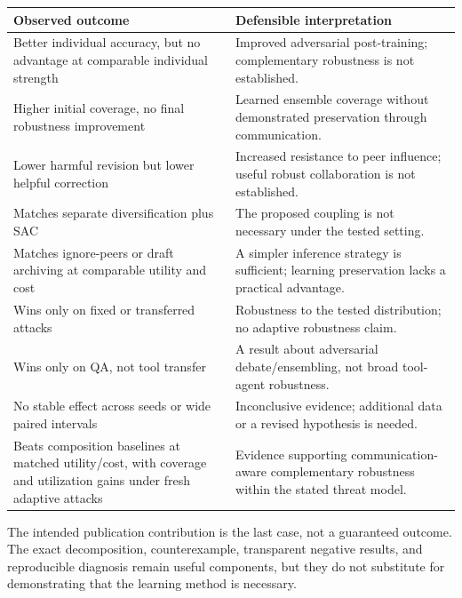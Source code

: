 \documentclass[10pt,twocolumn]{article}
\begin{document}
\begin{table}[h]
\centering\small
\begin{tabularx}{\textwidth}{@{}p{}X@{}}
\toprule
Observed outcome & Defensible interpretation \\
\midrule
Better individual accuracy, but no advantage at comparable individual strength & Improved adversarial post-training; complementary robustness is not established. \\
Higher initial coverage, no final robustness improvement & Learned ensemble coverage without demonstrated preservation through communication. \\
Lower harmful revision but lower helpful correction & Increased resistance to peer influence; useful robust collaboration is not established. \\
Matches separate diversification plus SAC & The proposed coupling is not necessary under the tested setting. \\
Matches ignore-peers or draft archiving at comparable utility and cost & A simpler inference strategy is sufficient; learning preservation lacks a practical advantage. \\
Wins only on fixed or transferred attacks & Robustness to the tested distribution; no adaptive robustness claim. \\
Wins only on QA, not tool transfer & A result about adversarial debate/ensembling, not broad tool-agent robustness. \\
No stable effect across seeds or wide paired intervals & Inconclusive evidence; additional data or a revised hypothesis is needed. \\
Beats composition baselines at matched utility/cost, with coverage and utilization gains under fresh adaptive attacks & Evidence supporting communication-aware complementary robustness within the stated threat model. \\
\bottomrule
\end{tabularx}
\end{table}

The intended publication contribution is the last case, not a guaranteed outcome. The exact decomposition, counterexample, transparent negative results, and reproducible diagnosis remain useful components, but they do not substitute for demonstrating that the learning method is necessary.
\end{document}
